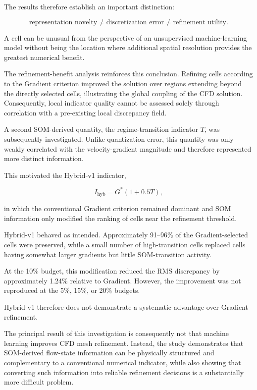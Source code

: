 The results therefore establish an important distinction:

\begin{equation}
\text{representation novelty}
\neq
\text{discretization error}
\neq
\text{refinement utility}.
\end{equation}

A cell can be unusual from the perspective of an unsupervised
machine-learning model without being the location where additional
spatial resolution provides the greatest numerical benefit.

The refinement-benefit analysis reinforces this conclusion. Refining
cells according to the Gradient criterion improved the solution over
regions extending beyond the directly selected cells, illustrating the
global coupling of the CFD solution. Consequently, local indicator
quality cannot be assessed solely through correlation with a pre-existing
local discrepancy field.

A second SOM-derived quantity, the regime-transition indicator \(T\),
was subsequently investigated. Unlike quantization error, this quantity
was only weakly correlated with the velocity-gradient magnitude and
therefore represented more distinct information.

This motivated the Hybrid-v1 indicator,

\begin{equation}
I_{\mathrm{hyb}}
=
G^{*}(1+0.5T),
\end{equation}

in which the conventional Gradient criterion remained dominant and SOM
information only modified the ranking of cells near the refinement
threshold.

Hybrid-v1 behaved as intended. Approximately 91--96\% of the
Gradient-selected cells were preserved, while a small number of
high-transition cells replaced cells having somewhat larger gradients
but little SOM-transition activity.

At the 10\% budget, this modification reduced the RMS discrepancy by
approximately 1.24\% relative to Gradient. However, the improvement was
not reproduced at the 5\%, 15\%, or 20\% budgets.

Hybrid-v1 therefore does not demonstrate a systematic advantage over
Gradient refinement.

The principal result of this investigation is consequently not that
machine learning improves CFD mesh refinement. Instead, the study
demonstrates that SOM-derived flow-state information can be physically
structured and complementary to a conventional numerical indicator,
while also showing that converting such information into reliable
refinement decisions is a substantially more difficult problem.

